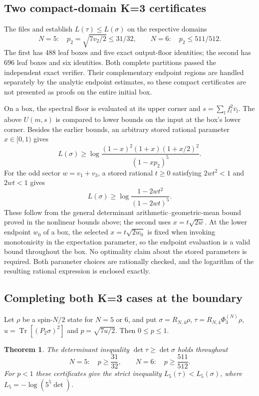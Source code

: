 \documentclass[11pt,a4paper]{article}
\newcommand{\Tr}{\operatorname{Tr}}
\newtheorem{theorem}{Theorem}
\begin{document}
\subsection{Two compact-domain K=3 certificates}
The files
 and
 establish
$L(\tau)\le L(\sigma)$ on the respective domains
\[
 N=5:\quad p_2=\sqrt{7v_2/2}\le31/32,
 \qquad
 N=6:\quad p_2\le511/512.
\]
The first has 488 leaf boxes and five exact output-floor identities;
the second has 696 leaf boxes and six identities. Both complete
partitions passed the independent exact verifier.
Their complementary endpoint regions are handled separately by the
analytic endpoint estimates, so these compact certificates are not
presented as proofs on the entire initial box.

On a box, the spectral floor is evaluated at its upper corner and
$s=\sum_lf_l^2\overline v_l$. The above $U(m,s)$ is compared to lower
bounds on the input at the box's lower corner. Besides the earlier
bounds, an arbitrary stored rational parameter $x\in[0,1)$ gives
\[
 L(\sigma)\ge
 \log\frac{(1-x)^2(1+x)(1+x/2)^2}{(1-xp_2)^5}.
\]
For the odd sector $w=v_1+v_3$, a stored rational $t\ge0$ satisfying
$2wt^2<1$ and $2wt<1$ gives
\[
 L(\sigma)\ge\log\frac{1-2wt^2}{(1-2wt)^5}.
\]
These follow from the general determinant arithmetic--geometric-mean
bound proved in the nonlinear bounds above; the second uses
$x=t\sqrt{2w}$. At the lower endpoint $w_0$ of a box, the selected
$x=t\sqrt{2w_0}$ is fixed when invoking monotonicity in the expectation
parameter, so the endpoint evaluation is a valid bound throughout the
box. No optimality claim about the stored parameters is required.
Both parameter choices are rationally checked, and the logarithm of the
resulting rational expression is enclosed exactly.


\subsection{Completing both K=3 cases at the boundary}
Let $\rho$ be a spin-$N/2$ state for $N=5$ or $6$, and put
$\sigma=R_{N,4}\rho$, $\tau=R_{N,4}\Phi_3^{(N)}\rho$,
$u=\Tr[(P_2\sigma)^2]$ and $p=\sqrt{7u/2}$.
Then $0\le p\le1$.
\begin{theorem}
The determinant inequality $\det\tau\ge\det\sigma$ holds throughout
\[
N=5:\quad p\ge\frac{31}{32},\qquad
N=6:\quad p\ge\frac{511}{512}.
\]
For $p<1$ these certificates give the strict inequality
$L_5(\tau)<L_5(\sigma)$, where $L_5=-\log(5^5\det)$.
\end{theorem}
\end{document}
